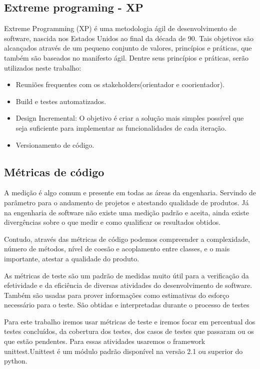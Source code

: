 \subsection{Extreme programing - XP}
\label{Sec:xp}
Extreme Programming (XP) é uma metodologia ágil de desenvolvimento de software, 
nascida nos Estados Unidos ao final da década de 90. Tais objetivos são 
alcançados através de um pequeno conjunto de valores, princípios
 e práticas, que também são baseados no manifesto ágil. Dentre seus princípios 
e práticas, serão utilizados neste trabalho: 

  \begin{itemize}
  \item Reuniões frequentes com os stakeholders(orientador e coorientador).     
  \item Build e testes automatizados.
  \cite{praticaXp}
  \item Design Incremental: O objetivo é criar a solução mais simples possível 
  que seja suficiente para implementar as funcionalidades de cada iteração.
  \cite{praticaXp}                                                        
  \item Versionamento de código.
  \cite{praticaXp}                                                        
  \end{itemize}                                                                 
  
\subsection{Métricas de código}
\label{Sec:Métricas de código}
  A medição é algo comum e presente em todas as áreas da engenharia. Servindo 
de parâmetro para o andamento de projetos e atestando qualidade de produtos. Já
na engenharia de software não existe uma medição padrão e aceita, ainda existe
divergências sobre o que medir e como qualificar os resultados obtidos.
  
  Contudo, através das métricas de código podemos compreender a complexidade, 
número de métodos, nível de coesão e acoplamento entre classes, e o mais 
importante, atestar a qualidade do produto. 

  As métricas de teste são um padrão de medidas muito útil para a verificação
da efetividade e da eficiência de diversas atividades do desenvolvimento de 
software. Também são usadas para prover informações como estimativas do esforço
necessário para o teste. São obtidas e interpretadas durante o processo de 
testes \cite{bradshaw}
  
 Para este trabalho iremos usar métricas de teste e iremos focar em percentual
dos testes concluídos, da cobertura dos testes, dos casos de testes que 
passaram ou os que estão pendentes. Para essas atividades usaremos o framework 
unittest.Unittest é um módulo padrão disponível na versão 2.1 ou superior do python.
